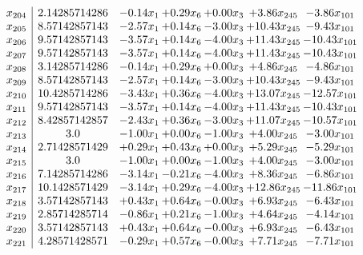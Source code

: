 \documentclass[8pt]{article}
\begin{document}
\[\begin{array}{c| c c@{\hskip 2pt} c@{\hskip 2pt} c@{\hskip 2pt} c@{\hskip 2pt} c@{\hskip 2pt} }
 x_{204}   &  2.14285714286 & -0.14 x_{1} & +  0.29 x_{6} & +  0.00 x_{3} & +  3.86 x_{245} & -3.86 x_{101}\\
 x_{205}   &  8.57142857143 & -2.57 x_{1} & +  0.14 x_{6} & -3.00 x_{3} & + 10.43 x_{245} & -9.43 x_{101}\\
 x_{206}   &  9.57142857143 & -3.57 x_{1} & +  0.14 x_{6} & -4.00 x_{3} & + 11.43 x_{245} & -10.43 x_{101}\\
 x_{207}   &  9.57142857143 & -3.57 x_{1} & +  0.14 x_{6} & -4.00 x_{3} & + 11.43 x_{245} & -10.43 x_{101}\\
 x_{208}   &  3.14285714286 & -0.14 x_{1} & +  0.29 x_{6} & +  0.00 x_{3} & +  4.86 x_{245} & -4.86 x_{101}\\
 x_{209}   &  8.57142857143 & -2.57 x_{1} & +  0.14 x_{6} & -3.00 x_{3} & + 10.43 x_{245} & -9.43 x_{101}\\
 x_{210}   &  10.4285714286 & -3.43 x_{1} & +  0.36 x_{6} & -4.00 x_{3} & + 13.07 x_{245} & -12.57 x_{101}\\
 x_{211}   &  9.57142857143 & -3.57 x_{1} & +  0.14 x_{6} & -4.00 x_{3} & + 11.43 x_{245} & -10.43 x_{101}\\
 x_{212}   &  8.42857142857 & -2.43 x_{1} & +  0.36 x_{6} & -3.00 x_{3} & + 11.07 x_{245} & -10.57 x_{101}\\
 x_{213}   &  3.0 & -1.00 x_{1} & +  0.00 x_{6} & -1.00 x_{3} & +  4.00 x_{245} & -3.00 x_{101}\\
 x_{214}   &  2.71428571429 & +  0.29 x_{1} & +  0.43 x_{6} & +  0.00 x_{3} & +  5.29 x_{245} & -5.29 x_{101}\\
 x_{215}   &  3.0 & -1.00 x_{1} & +  0.00 x_{6} & -1.00 x_{3} & +  4.00 x_{245} & -3.00 x_{101}\\
 x_{216}   &  7.14285714286 & -3.14 x_{1} & -0.21 x_{6} & -4.00 x_{3} & +  8.36 x_{245} & -6.86 x_{101}\\
 x_{217}   &  10.1428571429 & -3.14 x_{1} & +  0.29 x_{6} & -4.00 x_{3} & + 12.86 x_{245} & -11.86 x_{101}\\
 x_{218}   &  3.57142857143 & +  0.43 x_{1} & +  0.64 x_{6} & -0.00 x_{3} & +  6.93 x_{245} & -6.43 x_{101}\\
 x_{219}   &  2.85714285714 & -0.86 x_{1} & +  0.21 x_{6} & -1.00 x_{3} & +  4.64 x_{245} & -4.14 x_{101}\\
 x_{220}   &  3.57142857143 & +  0.43 x_{1} & +  0.64 x_{6} & -0.00 x_{3} & +  6.93 x_{245} & -6.43 x_{101}\\
 x_{221}   &  4.28571428571 & -0.29 x_{1} & +  0.57 x_{6} & -0.00 x_{3} & +  7.71 x_{245} & -7.71 x_{101}\\

\end{array}\]
\end{document}
